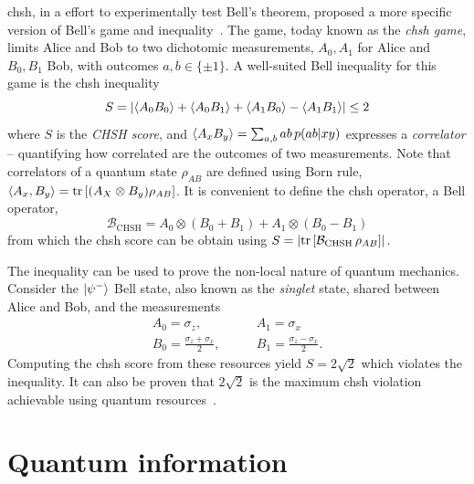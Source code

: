 \acrfull{chsh}, in a effort to experimentally test Bell's theorem, proposed a more specific version of Bell's game and inequality~\cite{Clauser1969}.
The game, today known as the \textit{\acrshort{chsh} game}, limits Alice and Bob to two dichotomic measurements, $A_0,A_1$ for Alice and $B_0,B_1$ Bob, with outcomes $a,b\in\{\pm 1\}$. 
A well-suited Bell inequality for this game is the \acrshort{chsh} inequality 
\begin{equation}
	S = \left | \langle {A_0 B_0} \rangle + \langle {A_0 B_1} \rangle + \langle {A_1 B_0} \rangle - \langle {A_1 B_1} \rangle  \right | \leq 2
	\label{eq:CHSH}
\end{equation}
where $S$ is the \textit{CHSH score}, and $\langle {A_x B_y} \rangle = \sum_{a,b} ab\,p(ab|xy)$ expresses a \textit{correlator} -- quantifying how correlated are the outcomes of two measurements.
Note that correlators of a quantum state $\rho_{AB}$ are defined using Born rule, $\mean{A_x,B_y} = \trr{(A_X \otimes B_y)\rho_{AB}}$.
It is convenient to define the \acrshort{chsh} operator, a Bell operator,
\begin{equation}
	\mathcal{B}_{\mathrm{CHSH}} = A_0 \otimes \left( B_0 + B_1 \right) + A_1 \otimes \left( B_0 - B_1 \right)
	\label{eq:CHSH_operator}
\end{equation}
from which the \acrshort{chsh} score can be obtain using $S = \left| \trr{\mathcal{B}_\mathrm{CHSH}\, \rho_{AB} } \right|$.

\medbreak

The inequality  can be used to prove the non-local nature of quantum mechanics. 
Consider the $\ket{\psi^-}$ Bell state, also known as the \textit{singlet} state, shared between Alice and Bob, and the measurements
\begin{equation}
	\begin{split}
		A_0 = \sigma_z, \quad & \quad A_1 = \sigma_x \\
		B_0 = \frac{\sigma_z+\sigma_x}{2}, \quad &\quad B_1 = \frac{\sigma_z - \sigma_x}{2}.
		\label{eq:CHSH_measurement}
	\end{split}
\end{equation}
Computing the \acrshort{chsh} score from these resources yield $S=2\sqrt{2}$ which violates the inequality.
It can also be proven that $2\sqrt{2}$ is the maximum \acrshort{chsh} violation achievable using quantum resources~\cite{Tsirelson1980}.

\chapter{Quantum information}
\label{chapter:quantumInfo}

